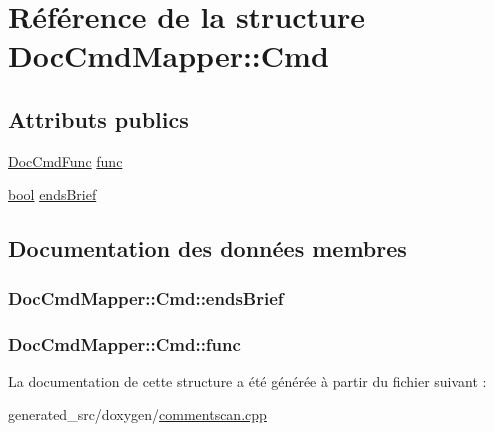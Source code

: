 \hypertarget{struct_doc_cmd_mapper_1_1_cmd}{}\section{Référence de la structure Doc\+Cmd\+Mapper\+:\+:Cmd}
\label{struct_doc_cmd_mapper_1_1_cmd}
\subsection*{Attributs publics}
\begin{DoxyCompactItemize}
\item 
\hyperlink{commentscan_8cpp_a6eda037087f774dcb0febdb34650d56d}{Doc\+Cmd\+Func} \hyperlink{struct_doc_cmd_mapper_1_1_cmd_afe8587817046b6c1074c9350037cfb06}{func}
\item 
\hyperlink{qglobal_8h_a1062901a7428fdd9c7f180f5e01ea056}{bool} \hyperlink{struct_doc_cmd_mapper_1_1_cmd_ad4275b59b317c26cc5798805291f77be}{ends\+Brief}
\end{DoxyCompactItemize}


\subsection{Documentation des données membres}
\hypertarget{struct_doc_cmd_mapper_1_1_cmd_ad4275b59b317c26cc5798805291f77be}{}
\subsubsection[{ends\+Brief}]{ Doc\+Cmd\+Mapper\+::\+Cmd\+::ends\+Brief}\label{struct_doc_cmd_mapper_1_1_cmd_ad4275b59b317c26cc5798805291f77be}
\hypertarget{struct_doc_cmd_mapper_1_1_cmd_afe8587817046b6c1074c9350037cfb06}{}
\subsubsection[{func}]{ Doc\+Cmd\+Mapper\+::\+Cmd\+::func}\label{struct_doc_cmd_mapper_1_1_cmd_afe8587817046b6c1074c9350037cfb06}


La documentation de cette structure a été générée à partir du fichier suivant \+:\begin{DoxyCompactItemize}
\item 
generated\+\_\+src/doxygen/\hyperlink{commentscan_8cpp}{commentscan.\+cpp}\end{DoxyCompactItemize}
